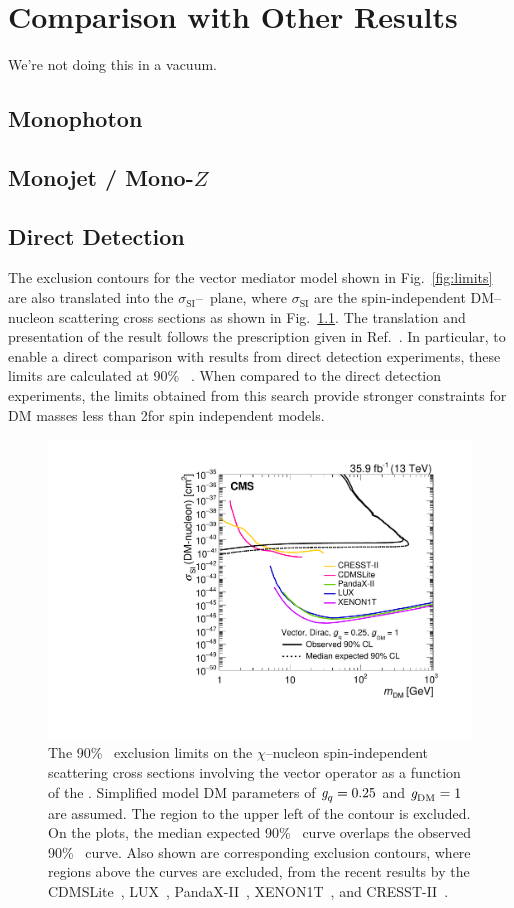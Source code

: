 \chapter{Comparison with Other Results}

We're not doing this in a vacuum.

\section{Monophoton}

\section{Monojet / Mono-$Z$}

\section{Direct Detection}

The exclusion contours for the vector mediator model shown in Fig.~\ref{fig:limits} are also translated into the $\sigma_{\text{SI}}$--\mdm\ plane, where $\sigma_{\text{SI}}$ are the spin-independent DM--nucleon scattering cross sections as shown in Fig.~\ref{fig:limits_direct}. 
The translation and presentation of the result follows the prescription given in Ref.~\cite{Boveia:2016mrp}.
In particular, to enable a direct comparison with results from direct detection experiments, these limits are calculated at 90\% \CL~\cite{dmforum}.
When compared to the direct detection experiments, the limits obtained from this search provide stronger constraints for DM masses less than 2\GeV for spin independent models.

\begin{figure}[htbp]
  \centering
    \includegraphics[width=0.48\linewidth]{Impact/Figures/limits_direct.pdf}
    \caption{
      The 90\% \CL\ exclusion limits on the $\chi$--nucleon spin-independent scattering cross sections involving the vector operator as a function of the \mdm.
      Simplified model DM parameters of $\gq=0.25$ and $\gDM=1$ are assumed.
      The region to the upper left of the contour is excluded. 
      On the plots, the median expected 90\% \CL\ curve overlaps the observed 90\% \CL\ curve.
      Also shown are corresponding exclusion contours, where regions above the curves are excluded, from the recent results by the CDMSLite~\cite{Agnese:2015nto}, LUX~\cite{Akerib:2016vxi}, PandaX-II~\cite{Cui:2017}, XENON1T~\cite{Aprile:2018}, and CRESST-II~\cite{Angloher:2015ewa}.
    }
    \label{fig:limits_direct}
\end{figure}

